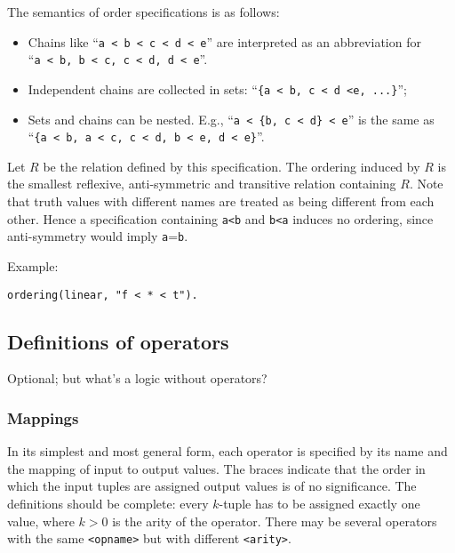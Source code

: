 \documentclass[]{article}
\providecommand{\tightlist}{%
  \setlength{\itemsep}{0pt}\setlength{\parskip}{0pt}}
\begin{document}
The semantics of order specifications is as follows:

\begin{itemize}
\tightlist
\item
  Chains like
  ``\texttt{a\ \textless{}\ b\ \textless{}\ c\ \textless{}\ d\ \textless{}\ e}''
  are interpreted as an abbreviation for
  ``\texttt{a\ \textless{}\ b,\ b\ \textless{}\ c,\ c\ \textless{}\ d,\ d\ \textless{}\ e}''.
\item
  Independent chains are collected in sets:
  ``\texttt{\{a\ \textless{}\ b,\ c\ \textless{}\ d\ \textless{}e,\ ...\}}'';
\item
  Sets and chains can be nested. E.g.,
  ``\texttt{a\ \textless{}\ \{b,\ c\ \textless{}\ d\}\ \textless{}\ e}''
  is the same as
  ``\texttt{\{a\ \textless{}\ b,\ a\ \textless{}\ c,\ c\ \textless{}\ d,\ b\ \textless{}\ e,\ d\ \textless{}\ e\}}''.
\end{itemize}

Let \(R\) be the relation defined by this specification. The ordering
induced by \(R\) is the smallest reflexive, anti-symmetric and
transitive relation containing \(R\). Note that truth values with
different names are treated as being different from each other. Hence a
specification containing \texttt{a\textless{}b} and
\texttt{b\textless{}a} induces no ordering, since anti-symmetry would
imply \texttt{a}=\texttt{b}.

Example:

\begin{verbatim}
ordering(linear, "f < * < t").
\end{verbatim}

\hypertarget{definitions-of-operators}{%
\subsection{Definitions of operators}\label{definitions-of-operators}}

Optional; but what's a logic without operators?

\hypertarget{mappings}{%
\subsubsection{Mappings}\label{mappings}}

In its simplest and most general form, each operator is specified by its
name and the mapping of input to output values. The braces indicate that
the order in which the input tuples are assigned output values is of no
significance. The definitions should be complete: every \(k\)-tuple has
to be assigned exactly one value, where \(k>0\) is the arity of the
operator. There may be several operators with the same
\texttt{\textless{}opname\textgreater{}} but with different
\texttt{\textless{}arity\textgreater{}}.
\end{document}
